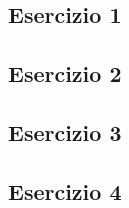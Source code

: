 \vspace{0.8cm}
\subsection{\textbf{Esercizio 1}}

\newpage
\subsection{\textbf{Esercizio 2}}

\newpage
\subsection{\textbf{Esercizio 3}}

\newpage
\subsection{\textbf{Esercizio 4}}

\newpage
